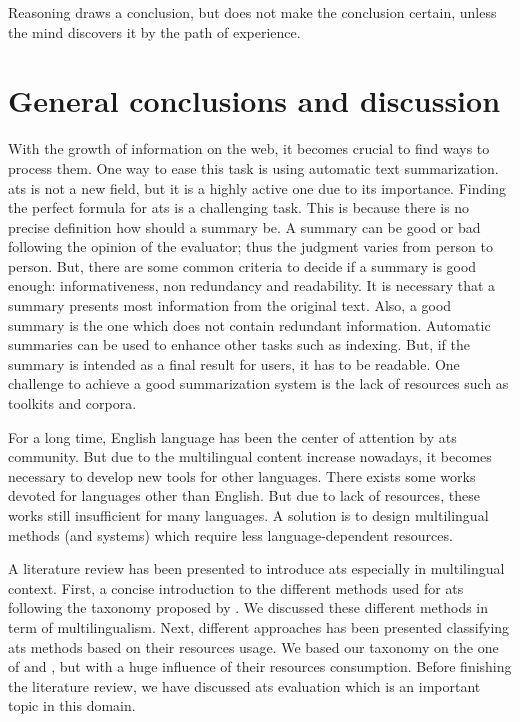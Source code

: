 \begin{savequote}[75mm] 
Reasoning draws a conclusion, but does not make the conclusion certain, unless the mind discovers it by the path of experience.
\end{savequote}

\chapter{General conclusions and discussion}

With the growth of information on the web, it becomes crucial to find ways to process them. 
One way to ease this task is using automatic text summarization. 
\ac{ats} is not a new field, but it is a highly active one due to its importance. 
Finding the perfect formula for \ac{ats} is a challenging task. 
This is because there is no precise definition how should a summary be.
A summary can be good or bad following the opinion of the evaluator; thus the judgment varies from person to person.
But, there are some common criteria to decide if a summary is good enough: informativeness, non redundancy and readability. 
It is necessary that a summary presents most information from the original text. 
Also, a good summary is the one which does not contain redundant information. 
Automatic summaries can be used to enhance other tasks such as indexing. 
But, if the summary is intended as a final result for users, it has to be readable. 
One challenge to achieve a good summarization system is the lack of resources such as toolkits and corpora.

For a long time, English language has been the center of attention by \ac{ats} community. 
But due to the multilingual content increase nowadays, it becomes necessary to develop new tools for other languages. 
There exists some works devoted for languages other than English. 
But due to lack of resources, these works still insufficient for many languages. 
A solution is to design multilingual methods (and systems) which require less language-dependent resources.


A literature review has been presented to introduce \ac{ats} especially in multilingual context. 
First, a concise introduction to the different methods used for \ac{ats} following the taxonomy proposed by \citet{98-hovy-lin,99-sparckjones}. 
We discussed these different methods in term of multilingualism.
Next, different approaches has been presented classifying \ac{ats} methods based on their resources usage. 
We based our taxonomy on the one of \citet{12-lloret-palomar} and \citet{11-nenkova-mckeown}, but with a huge influence of their resources consumption.
Before finishing the literature review, we have discussed \ac{ats} evaluation which is an important topic in this domain.

